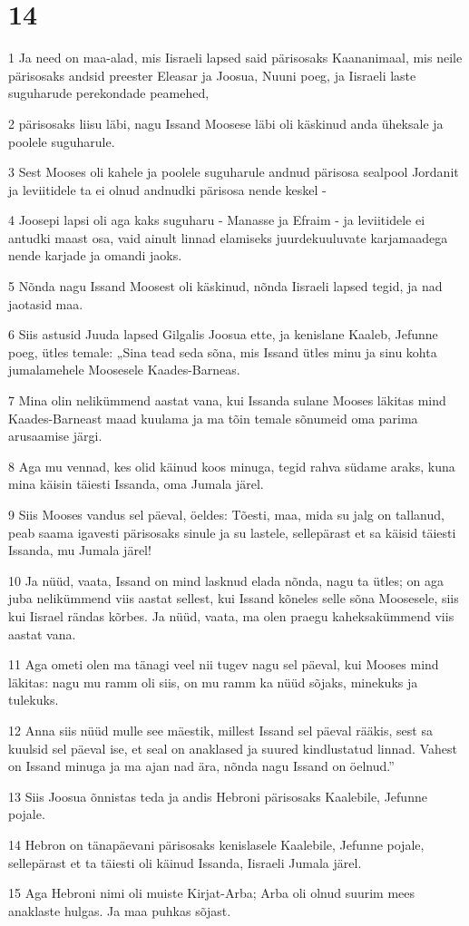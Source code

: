 \chapter{14}

\par 1 Ja need on maa-alad, mis Iisraeli lapsed said pärisosaks Kaananimaal, mis neile pärisosaks andsid preester Eleasar ja Joosua, Nuuni poeg, ja Iisraeli laste suguharude perekondade peamehed,
\par 2 pärisosaks liisu läbi, nagu Issand Moosese läbi oli käskinud anda üheksale ja poolele suguharule.
\par 3 Sest Mooses oli kahele ja poolele suguharule andnud pärisosa sealpool Jordanit ja leviitidele ta ei olnud andnudki pärisosa nende keskel -
\par 4 Joosepi lapsi oli aga kaks suguharu - Manasse ja Efraim - ja leviitidele ei antudki maast osa, vaid ainult linnad elamiseks juurdekuuluvate karjamaadega nende karjade ja omandi jaoks.
\par 5 Nõnda nagu Issand Moosest oli käskinud, nõnda Iisraeli lapsed tegid, ja nad jaotasid maa.
\par 6 Siis astusid Juuda lapsed Gilgalis Joosua ette, ja kenislane Kaaleb, Jefunne poeg, ütles temale: „Sina tead seda sõna, mis Issand ütles minu ja sinu kohta jumalamehele Moosesele Kaades-Barneas.
\par 7 Mina olin nelikümmend aastat vana, kui Issanda sulane Mooses läkitas mind Kaades-Barneast maad kuulama ja ma tõin temale sõnumeid oma parima arusaamise järgi.
\par 8 Aga mu vennad, kes olid käinud koos minuga, tegid rahva südame araks, kuna mina käisin täiesti Issanda, oma Jumala järel.
\par 9 Siis Mooses vandus sel päeval, öeldes: Tõesti, maa, mida su jalg on tallanud, peab saama igavesti pärisosaks sinule ja su lastele, sellepärast et sa käisid täiesti Issanda, mu Jumala järel!
\par 10 Ja nüüd, vaata, Issand on mind lasknud elada nõnda, nagu ta ütles; on aga juba nelikümmend viis aastat sellest, kui Issand kõneles selle sõna Moosesele, siis kui Iisrael rändas kõrbes. Ja nüüd, vaata, ma olen praegu kaheksakümmend viis aastat vana.
\par 11 Aga ometi olen ma tänagi veel nii tugev nagu sel päeval, kui Mooses mind läkitas: nagu mu ramm oli siis, on mu ramm ka nüüd sõjaks, minekuks ja tulekuks.
\par 12 Anna siis nüüd mulle see mäestik, millest Issand sel päeval rääkis, sest sa kuulsid sel päeval ise, et seal on anaklased ja suured kindlustatud linnad. Vahest on Issand minuga ja ma ajan nad ära, nõnda nagu Issand on öelnud.”
\par 13 Siis Joosua õnnistas teda ja andis Hebroni pärisosaks Kaalebile, Jefunne pojale.
\par 14 Hebron on tänapäevani pärisosaks kenislasele Kaalebile, Jefunne pojale, sellepärast et ta täiesti oli käinud Issanda, Iisraeli Jumala järel.
\par 15 Aga Hebroni nimi oli muiste Kirjat-Arba; Arba oli olnud suurim mees anaklaste hulgas. Ja maa puhkas sõjast.

